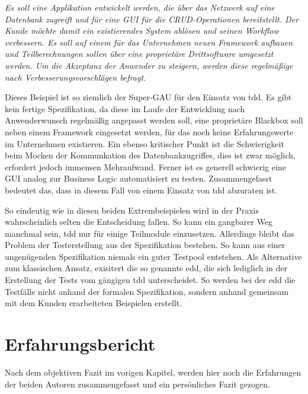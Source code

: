 \documentclass{mitschrift}
\begin{document}
\begin{beispiel}
  \textit{Es soll eine Applikation entwickelt werden, die über das Netzwerk auf eine
  Datenbank zugreift und für eine GUI für die CRUD-Operationen bereitstellt. Der
  Kunde möchte damit ein existierendes System ablösen und seinen Workflow verbessern. Es
  soll auf einem für das Unternehmen neuen Framework aufbauen und Teilberechnungen sollen
  über eine proprietäre Drittsoftware umgesetzt werden. Um die Akzeptanz der Anwender zu
  steigern, werden diese regelmäßige nach Verbesserungsvorschlägen befragt.}
  
  Dieses Beispiel ist so ziemlich der Super-GAU für den Einsatz von \gls{tdd}. Es gibt
  kein fertige Spezifikation, da diese im Laufe der Entwicklung nach Anwenderwunsch
  regelmäßig angepasst werden soll, eine proprietäre Blackbox soll neben einem Framework
  eingesetzt werden, für das noch keine Erfahrungswerte im Unternehmen existieren. Ein
  ebenso kritischer Punkt ist die Schwierigkeit beim Mocken der Kommunkation des 
  Datenbankzugriffes, dies ist zwar möglich, erfordert jedoch immensen Mehraufwand.
  Ferner ist es generell schwierig eine GUI analog zur Business Logic automatisiert zu
  testen. Zusammengefasst bedeutet das, dass in diesem Fall von einem Einsatz von \gls{tdd}
  abzuraten ist.
\end{beispiel}

So eindeutig wie in diesen beiden Extrembeispielen wird in der Praxis wahrscheinlich selten 
die Entscheidung fallen. So kann ein gangbarer Weg manchmal sein, \gls{tdd} nur für einige
Teilmodule einzusetzen. Allerdings bleibt das Problem der Testerstellung aus der Spezifikation
bestehen. So kann aus einer ungenügenden Spezifikation niemals ein guter Testpool entstehen. Als
Alternative zum klassischen Ansatz, exisitert die so genannte \gls{edd},
die sich lediglich in der Erstellung der Tests vom gängigen \gls{tdd} unterscheidet. So werden
bei der \gls{edd} die Testfälle nicht anhand der formalen Spezifikation, sondern
anhand gemeinsam mit dem Kunden erarbeiteten Beispielen erstellt.

\chapter{Erfahrungsbericht}\label{Erfahrungsbericht}
Nach dem objektiven Fazit im vorigen Kapitel, werden hier noch die Erfahrungen
der beiden Autoren zusammengefasst und ein persönliches Fazit gezogen.
\end{document}
